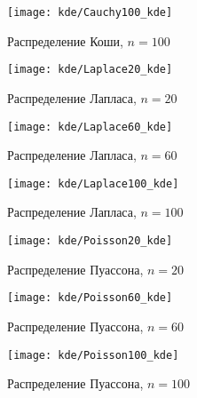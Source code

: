 \begin{figure}[H]
	\begin{center}
		\texttt{[image: kde/Cauchy100\_kde]}
		\caption{Распределение Коши, $n=100$} 
		\label{pic:pic_name} 
	\end{center}
\end{figure}

\begin{figure}[H]
	\begin{center}
		\texttt{[image: kde/Laplace20\_kde]}
		\caption{Распределение Лапласа, $n=20$} 
		\label{pic:pic_name} 
	\end{center}
\end{figure}

\begin{figure}[H]
	\begin{center}
		\texttt{[image: kde/Laplace60\_kde]}
		\caption{Распределение Лапласа, $n=60$} 
		\label{pic:pic_name} 
	\end{center}
\end{figure}

\begin{figure}[H]
	\begin{center}
		\texttt{[image: kde/Laplace100\_kde]}
		\caption{Распределение Лапласа, $n=100$} 
		\label{pic:pic_name} 
	\end{center}
\end{figure}

\begin{figure}[H]
	\begin{center}
		\texttt{[image: kde/Poisson20\_kde]}
		\caption{Распределение Пуассона, $n=20$} 
		\label{pic:pic_name} 
	\end{center}
\end{figure}

\begin{figure}[H]
	\begin{center}
		\texttt{[image: kde/Poisson60\_kde]}
		\caption{Распределение Пуассона, $n=60$} 
		\label{pic:pic_name} 
	\end{center}
\end{figure}

\begin{figure}[H]
	\begin{center}
		\texttt{[image: kde/Poisson100\_kde]}
		\caption{Распределение Пуассона, $n=100$} 
		\label{pic:pic_name} 
	\end{center}
\end{figure}

